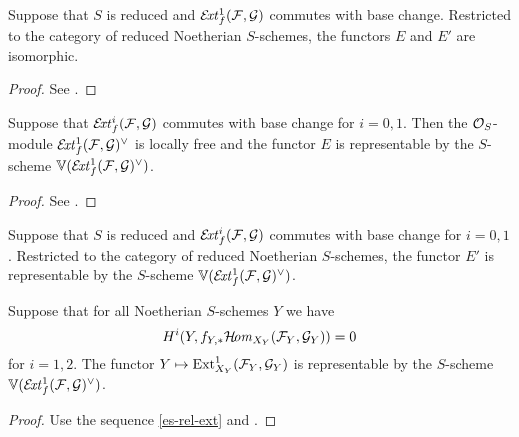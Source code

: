\begin{proposition}
	Suppose that $S$ is reduced and $\mathcal{E}\!\mathit{xt}^1_f(\mathcal{F},\mathcal{G})$ commutes with base change. Restricted to the category of reduced Noetherian $S$-schemes, the functors $E$ and $E'$ are isomorphic.
\end{proposition}
\begin{proof}
	See \cite[Prop. 2.3]{lange-universal-extensions}.
\end{proof}
\begin{proposition} \label{e-representable}
	Suppose that $\mathcal{E}\!\mathit{xt}^i_f(\mathcal{F},\mathcal{G})$ commutes with base change for $i=0,1$. Then the $\mathcal{O}_S$-module $\mathcal{E}\!\mathit{xt}^1_f(\mathcal{F},\mathcal{G})^\vee$ is locally free and the functor $E$ is representable by the $S$-scheme $\mathbb{V}(\mathcal{E}\!\mathit{xt}^1_f(\mathcal{F},\mathcal{G})^\vee)$.
\end{proposition}
\begin{proof}
	See \cite[Prop. 3.1]{lange-universal-extensions}.
\end{proof}
\begin{corollary}
	Suppose that $S$ is reduced and $\mathcal{E}\!\mathit{xt}^i_f(\mathcal{F},\mathcal{G})$ commutes with base change for $i=0,1$. Restricted to the category of reduced Noetherian $S$-schemes, the functor $E'$ is representable by the $S$-scheme $\mathbb{V}(\mathcal{E}\!\mathit{xt}^1_f(\mathcal{F},\mathcal{G})^\vee)$.
\end{corollary}

\begin{corollary}
	Suppose that for all Noetherian $S$-schemes $Y$ we have
	$$H^i(Y,f_{Y,*} \mathcal{H}\!\mathit{om}_{X_Y}(\mathcal{F}_Y,\mathcal{G}_Y)) = 0$$ for $i=1,2$. The functor $Y \mapsto \operatorname{Ext}^1_{X_Y}(\mathcal{F}_Y,\mathcal{G}_Y)$ is representable by the $S$-scheme $\mathbb{V}(\mathcal{E}\!\mathit{xt}^1_f(\mathcal{F},\mathcal{G})^\vee)$.
\end{corollary}

\begin{proof}
	Use the sequence \cref{es-rel-ext} and .
\end{proof}



